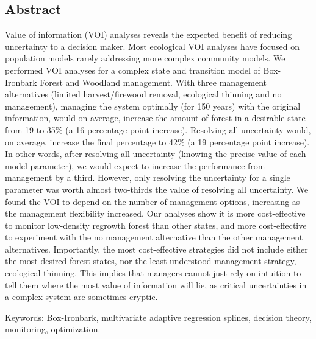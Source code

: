 
\subsection*{Abstract}\label{abstract}

Value of information (VOI) analyses reveals the expected benefit of reducing uncertainty to a decision maker. Most ecological VOI analyses have focused on population models rarely addressing more complex community models. We performed VOI analyses for a complex state and transition model of Box-Ironbark Forest and Woodland management. With three management alternatives (limited harvest/firewood removal, ecological thinning and no management), managing the system optimally (for 150 years) with the original information, would on average, increase the amount of forest in a desirable state from 19 to 35\% (a 16 percentage point increase). Resolving all uncertainty would, on average, increase the final percentage to 42\% (a 19 percentage point increase). In other words, after resolving all uncertainty (knowing the precise value of each model parameter), we would expect to increase the performance from management by a third. However, only resolving the uncertainty for a single parameter was worth almost two-thirds the value of resolving all uncertainty. We found the VOI to depend on the number of management options, increasing as the management flexibility increased. Our analyses show it is more cost-effective to monitor low-density regrowth forest than other states, and more cost-effective to experiment with the no management alternative than the other management alternatives. Importantly, the most cost-effective strategies did not include either the most desired forest states, nor the least understood management strategy, ecological thinning. This implies that managers cannot just rely on intuition to tell them where the most value of information will lie, as critical uncertainties in a complex system are sometimes cryptic.

Keywords: Box-Ironbark, multivariate adaptive regression splines, decision theory, monitoring, optimization.
